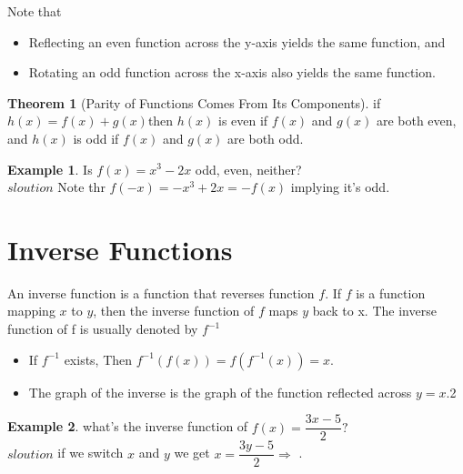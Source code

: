 \documentclass[a4paper]{article}
\theoremstyle{definition}
\newtheorem{exmp}{Example}[section]
\newtheorem{theorem}{Theorem}
\begin{document}
Note that
\begin{itemize}
    \item Reflecting an even function across the y-axis yields the same function, and
    \item Rotating an odd function across the x-axis also yields the same function.
\end{itemize}

\begin{theorem}[Parity of Functions Comes From Its Components]
    if \(h(x) = f(x) + g(x)\)then
    \(h(x)\) is even if \(f(x)\) and \(g(x)\) are both even,
    and \(h(x)\) is odd if \(f(x)\) and \(g(x)\) are both odd.
\end{theorem}

\begin{exmp}
    Is \(f(x) = x^3 - 2x\) odd, even, neither?  \\

    \(sloution\) Note thr \(f(-x) = -x^3 + 2x = -f(x)\) implying it's odd.
\end{exmp}

\section{Inverse Functions}
An inverse function is a function that reverses function \(f\).
If \(f\) is a function mapping \(x\) to \(y\),
then the inverse function of \(f\) maps \(y\) back to x. The
inverse function of f is usually denoted by \(f^{-1}\)

\begin{itemize}
    \item If \(f^{-1}\) exists, Then \(f^{-1}(f(x)) = f(f^{-1}(x)) = x\).
    \item The graph of the inverse is the graph of the function reflected across
          \(y = x\).2
\end{itemize}


\begin{exmp}
    what's the inverse function of \(f(x) = \dfrac{3x-5}{2}? \)
    \\

    \(sloution\) if we switch \(x\) and \(y\) we get \(x = \dfrac{3y-5}{2}
    \Rightarrow \) .
\end{exmp}
\end{document}
